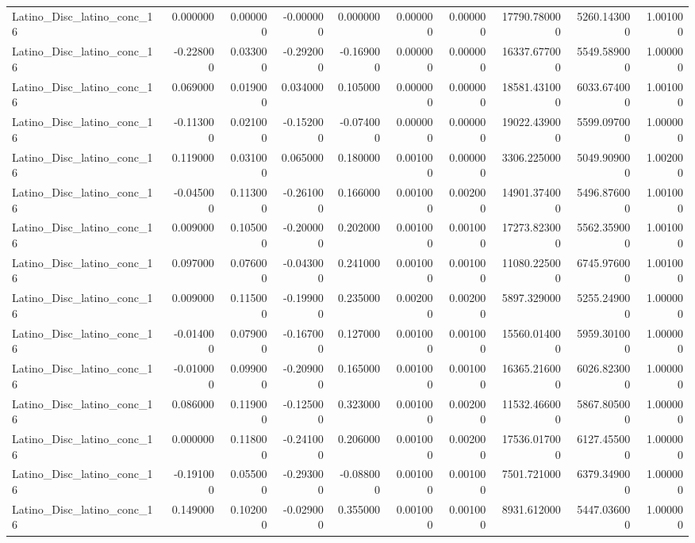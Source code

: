 \begin{table}
\begin{tabular}{lrrrrrrrrr}
Latino_Disc_latino_conc_16 & 0.000000 & 0.000000 & -0.000000 & 0.000000 & 0.000000 & 0.000000 & 17790.780000 & 5260.143000 & 1.001000 \\
Latino_Disc_latino_conc_16 & -0.228000 & 0.033000 & -0.292000 & -0.169000 & 0.000000 & 0.000000 & 16337.677000 & 5549.589000 & 1.000000 \\
Latino_Disc_latino_conc_16 & 0.069000 & 0.019000 & 0.034000 & 0.105000 & 0.000000 & 0.000000 & 18581.431000 & 6033.674000 & 1.001000 \\
Latino_Disc_latino_conc_16 & -0.113000 & 0.021000 & -0.152000 & -0.074000 & 0.000000 & 0.000000 & 19022.439000 & 5599.097000 & 1.000000 \\
Latino_Disc_latino_conc_16 & 0.119000 & 0.031000 & 0.065000 & 0.180000 & 0.001000 & 0.000000 & 3306.225000 & 5049.909000 & 1.002000 \\
Latino_Disc_latino_conc_16 & -0.045000 & 0.113000 & -0.261000 & 0.166000 & 0.001000 & 0.002000 & 14901.374000 & 5496.876000 & 1.001000 \\
Latino_Disc_latino_conc_16 & 0.009000 & 0.105000 & -0.200000 & 0.202000 & 0.001000 & 0.001000 & 17273.823000 & 5562.359000 & 1.001000 \\
Latino_Disc_latino_conc_16 & 0.097000 & 0.076000 & -0.043000 & 0.241000 & 0.001000 & 0.001000 & 11080.225000 & 6745.976000 & 1.001000 \\
Latino_Disc_latino_conc_16 & 0.009000 & 0.115000 & -0.199000 & 0.235000 & 0.002000 & 0.002000 & 5897.329000 & 5255.249000 & 1.000000 \\
Latino_Disc_latino_conc_16 & -0.014000 & 0.079000 & -0.167000 & 0.127000 & 0.001000 & 0.001000 & 15560.014000 & 5959.301000 & 1.000000 \\
Latino_Disc_latino_conc_16 & -0.010000 & 0.099000 & -0.209000 & 0.165000 & 0.001000 & 0.001000 & 16365.216000 & 6026.823000 & 1.000000 \\
Latino_Disc_latino_conc_16 & 0.086000 & 0.119000 & -0.125000 & 0.323000 & 0.001000 & 0.002000 & 11532.466000 & 5867.805000 & 1.000000 \\
Latino_Disc_latino_conc_16 & 0.000000 & 0.118000 & -0.241000 & 0.206000 & 0.001000 & 0.002000 & 17536.017000 & 6127.455000 & 1.000000 \\
Latino_Disc_latino_conc_16 & -0.191000 & 0.055000 & -0.293000 & -0.088000 & 0.001000 & 0.001000 & 7501.721000 & 6379.349000 & 1.000000 \\
Latino_Disc_latino_conc_16 & 0.149000 & 0.102000 & -0.029000 & 0.355000 & 0.001000 & 0.001000 & 8931.612000 & 5447.036000 & 1.000000 \\

\end{tabular}
\end{table}
